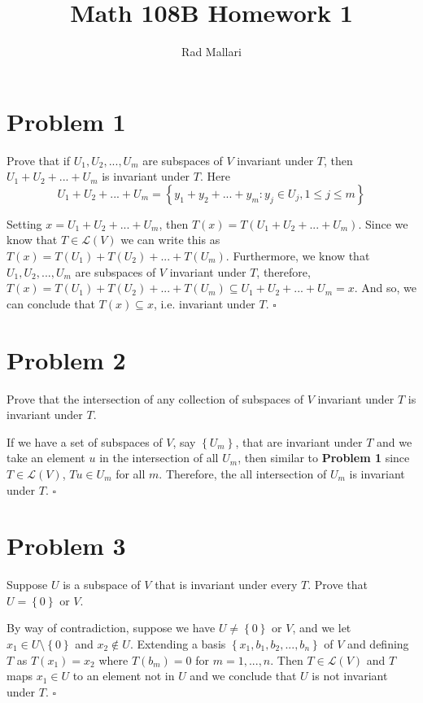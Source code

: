 \documentclass[12pt]{article}
\title{Math 108B Homework 1}
\author{Rad Mallari}
\newcommand{\set}[1]{\left\{ #1\right\}}
\newenvironment{proof}{\noindent{\bf Proof.}}{\hfill $\square$\medskip}
\begin{document}
\maketitle

\section{Problem 1}
Prove that if $U_{1}, U_{2}, ..., U_{m}$ are subspaces of $V$ invariant under $T$, then $U_{1}+U_{2}+...+U_{m}$ is invariant under $T$. Here
$$U_{1}+U_{2}+...+U_{m}=\set{y_{1}+y_{2}+...+y_{m}:y_{j}\in U_{j}, 1\leq j\leq m}$$

\begin{proof}
Setting $x=U_{1}+U_{2}+...+U_{m}$, then $T(x)=T(U_{1}+U_{2}+...+U_{m})$. Since we know that $T\in\mathcal{L}(V)$ we can write this as $T(x)=T(U_{1})+T(U_{2})+...+T(U_{m})$. Furthermore, we know that $U_{1}, U_{2}, ..., U_{m}$ are subspaces of $V$ invariant under $T$, therefore, $T(x)=T(U_{1})+T(U_{2})+...+T(U_{m})\subseteq U_{1}+U_{2}+...+U_{m}=x$. And so, we can conclude that $T(x)\subseteq x$, i.e. invariant under $T$.
\end{proof}


\section{Problem 2}
Prove that the intersection of any collection of subspaces of $V$ invariant under $T$ is invariant under $T$.

\begin{proof}
If we have a set of subspaces of $V$, say $\set{U_{m}}$, that are invariant under $T$ and we take an element $u$ in the intersection of all $U_{m}$, then similar to \textbf{Problem 1} since $T\in\mathcal{L}(V)$, $Tu\in U_{m}$ for all $m$. Therefore, the all intersection of $U_{m}$ is invariant under $T$.
\end{proof}


\section{Problem 3}
Suppose $U$ is a subspace of $V$ that is invariant under every $T$. Prove that $U=\set{0}$ or $V$.

\begin{proof}
By way of contradiction, suppose we have $U\neq\set{0}\text{ or }V$, and we let $x_{1}\in U\setminus\set{0}$ and $x_{2}\not\in U$. Extending a basis $\set{x_{1},b_{1},b_{2},...,b_{n}}$ of $V$ and defining $T$ as $T(x_{1})=x_{2}$ where $T(b_{m})=0$ for $m=1,...,n$. Then $T\in\mathcal{L}(V)$ and $T$ maps $x_{1}\in U$ to an element not in $U$ and we conclude that $U$ is not invariant under $T$.
\end{proof}
\end{document}
